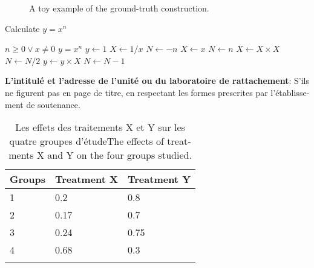\begin{otherlanguage}{french}
\begin{figure}[!htb]
	\caption[A toy example of the ground-truth construction.]{A toy example of the ground-truth construction.}%
	\label{fig:gt-dtw}
\end{figure}

\begin{algorithm}
	\caption{Calculate $y = x^n$}
	\begin{algorithmic}
		\REQUIRE $n \geq 0 \vee x \neq 0$
		\ENSURE $y = x^n$
		\STATE $y \leftarrow 1$
		\STATE $X \leftarrow 1 / x$
		\STATE $N \leftarrow -n$
		\ELSE
		\STATE $X \leftarrow x$
		\STATE $N \leftarrow n$
		\ENDIF
		\STATE $X \leftarrow X \times X$
		\STATE $N \leftarrow N / 2$
		\ELSE[$N$ is odd]
		\STATE $y \leftarrow y \times X$
		\STATE $N \leftarrow N - 1$
		\ENDIF
		\ENDWHILE
	\end{algorithmic}
\end{algorithm}

\textbf{L’intitulé et l'adresse de l'unité ou du laboratoire de rattachement}:
S’ils ne figurent pas en page de titre, en respectant les formes prescrites par l’établissement de soutenance.


\begin{table}
\caption{Les effets des traitements X et Y sur les quatre groupes d'étudeThe effects of treatments X and Y on the four groups studied.}%
\label{tab:treatmentsf}
\centering
\begin{tabular}{l l l}
\toprule
Groups & Treatment X & Treatment Y \\
\midrule
1 & 0.2 & 0.8\\
2 & 0.17 & 0.7\\
3 & 0.24 & 0.75\\
4 & 0.68 & 0.3\\
\bottomrule\\
\end{tabular}
\end{table}

\end{otherlanguage}
